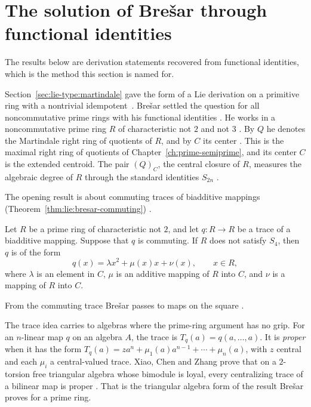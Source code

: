 \section{The solution of Brešar through functional identities}\label{sec:lie-type:bresar}

The results below are derivation statements recovered from functional
identities, which is the method this section is named for.

Section~\ref{sec:lie-type:martindale} gave the form of a Lie derivation on a
primitive ring with a nontrivial idempotent~\cite[p.~526]{Bresar1993LieTAMS}. Brešar settled the question for
all noncommutative prime rings with his functional identities
\cite[p.~525]{Bresar1993LieTAMS}. He works in a noncommutative prime ring $R$
of characteristic not $2$ and not $3$ \cite[p.~525]{Bresar1993LieTAMS}. By $Q$
he denotes the Martindale right ring of quotients of $R$, and by $C$ its
center \cite[p.~525]{Bresar1993LieTAMS}. This is the maximal right ring of
quotients of Chapter~\ref{ch:prime-semiprime}, and its center $C$ is the
extended centroid. The pair $(Q)_{C}$, the central closure of $R$, measures
the algebraic degree of $R$ through the standard identities $S_{2n}$
\cite[p.~526]{Bresar1993LieTAMS}.

The opening result is about commuting traces of biadditive mappings (Theorem~\ref{thm:lie:bresar-commuting}) \cite[Theorem~1, p.~526]{Bresar1993LieTAMS}.

\begin{theorem}\label{thm:lie:bresar-commuting}
Let $R$ be a prime ring of characteristic not $2$, and let $q\colon R\to R$ be a
trace of a biadditive mapping. Suppose that $q$ is commuting. If $R$ does not
satisfy $S_{4}$, then $q$ is of the form
\[
q(x)=\lambda x^{2}+\mu(x)x+\nu(x),\qquad x\in R,
\]
where $\lambda$ is an element in $C$, $\mu$ is an additive mapping of $R$ into $C$,
and $\nu$ is a mapping of $R$ into $C$.
\end{theorem}

From the commuting trace Brešar passes to maps on the square
\cite[pp.~521--522]{Bresar1993LieTAMS}.

The trace idea carries to algebras where the prime-ring argument has no grip.
For an $n$-linear map $q$ on an algebra $A$, the trace is
$T_{q}(a)=q(a,\dots,a)$. It is \emph{proper} \cite[p.~2]{XiaoChenZhang2015Centralizing}
when it has the form $T_{q}(a)=za^{n}+\mu_{1}(a)a^{n-1}+\cdots+\mu_{n}(a)$,
with $z$ central and each $\mu_{i}$ a central-valued trace. Xiao, Chen and Zhang prove that on
a $2$-torsion free triangular algebra whose bimodule is loyal, every
centralizing trace of a bilinear map is proper
\cite[Theorem~3.4]{XiaoChenZhang2015Centralizing}. That is the triangular
algebra form of the result Brešar proves for a prime ring.

